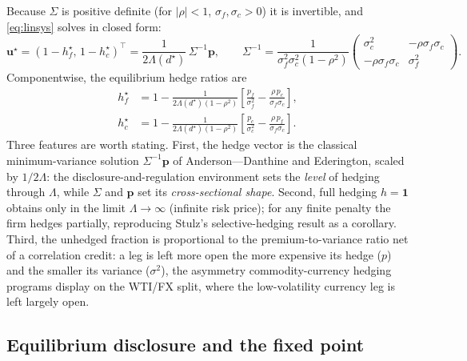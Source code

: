 \documentclass[11pt,a4paper]{article}
\begin{document}
Because $\Sigma$ is positive definite (for $|\rho|<1$, $\sigma_f,\sigma_c>0$) it is invertible, and \eqref{eq:linsys} solves in closed form:
\begin{equation}
\mathbf{u}^\star=(1-h_f^\star,\,1-h_c^\star)^\top=\frac{1}{2\Lambda(d^\star)}\,\Sigma^{-1}\mathbf{p},
\qquad
\Sigma^{-1}=\frac{1}{\sigma_f^2\sigma_c^2(1-\rho^2)}\begin{pmatrix}\sigma_c^2 & -\rho\sigma_f\sigma_c\\ -\rho\sigma_f\sigma_c & \sigma_f^2\end{pmatrix}.
\label{eq:usol}
\end{equation}
Componentwise, the equilibrium hedge ratios are
\begin{align}
h_f^\star&=1-\frac{1}{2\Lambda(d^\star)(1-\rho^2)}\left[\frac{p_f}{\sigma_f^2}-\frac{\rho\,p_c}{\sigma_f\sigma_c}\right],\label{eq:hfstar}\\[4pt]
h_c^\star&=1-\frac{1}{2\Lambda(d^\star)(1-\rho^2)}\left[\frac{p_c}{\sigma_c^2}-\frac{\rho\,p_f}{\sigma_f\sigma_c}\right].\label{eq:hcstar}
\end{align}
Three features are worth stating. First, the hedge vector is the classical minimum-variance solution $\Sigma^{-1}\mathbf p$ of Anderson---Danthine and Ederington, scaled by $1/2\Lambda$: the disclosure-and-regulation environment sets the \emph{level} of hedging through $\Lambda$, while $\Sigma$ and $\mathbf p$ set its \emph{cross-sectional shape}. Second, full hedging $h=\mathbf 1$ obtains only in the limit $\Lambda\to\infty$ (infinite risk price); for any finite penalty the firm hedges partially, reproducing Stulz's selective-hedging result as a corollary. Third, the unhedged fraction is proportional to the premium-to-variance ratio net of a correlation credit: a leg is left more open the more expensive its hedge ($p$) and the smaller its variance ($\sigma^2$), the asymmetry commodity-currency hedging programs display on the WTI/FX split, where the low-volatility currency leg is left largely open.

\subsection{Equilibrium disclosure and the fixed point}
\label{sec:dsol}
\end{document}
